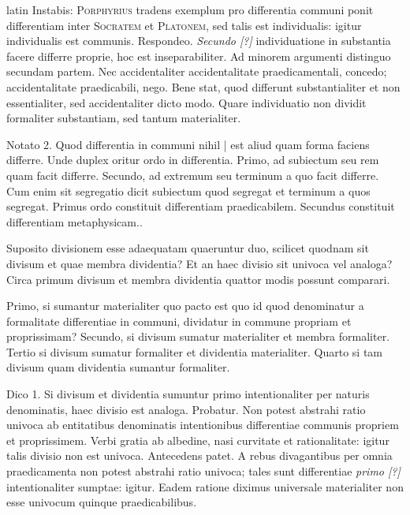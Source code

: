 \begin{otherlanguage*}{latin}
\pstart
 Instabis: \textsc{Porphyrius} tradens exemplum pro differentia communi ponit differentiam inter \textsc{Socratem} et \textsc{Platonem}, sed talis est individualis: igitur individualis est communis. Respondeo. \emph{Secundo [?]} individuatione in substantia facere differre proprie, hoc est inseparabiliter. Ad minorem argumenti distinguo secundam partem. Nec accidentaliter accidentalitate praedicamentali, concedo; accidentalitate praedicabili, nego. Bene stat, quod differunt substantialiter et non essentialiter, sed accidentaliter dicto modo. Quare individuatio non dividit formaliter substantiam, sed tantum materialiter. 
\pend

\pstart
 Notato 2. Quod differentia in communi nihil \textnormal{|} est aliud quam forma faciens differre. Unde duplex oritur ordo in differentia. Primo, ad subiectum seu rem quam facit differre. Secundo, ad extremum seu terminum a quo facit differre. Cum enim sit segregatio dicit subiectum quod segregat et terminum a quos segregat. Primus ordo constituit differentiam praedicabilem. Secundus constituit differentiam metaphysicam.. 
\pend

\pstart
 Suposito divisionem esse adaequatam quaeruntur duo, scilicet quodnam sit divisum et quae membra dividentia? Et an haec divisio sit univoca vel analoga? Circa primum divisum et membra dividentia quattor modis possunt comparari. 
\pend

\pstart
 Primo, si sumantur materialiter quo pacto est quo id quod denominatur a formalitate differentiae in communi, dividatur in commune propriam et proprissimam? Secundo, si divisum sumatur materialiter et membra formaliter. Tertio si divisum sumatur formaliter et dividentia materialiter. Quarto si tam divisum quam dividentia sumantur formaliter. 
\pend

\pstart
 Dico 1. Si divisum et dividentia sumuntur primo intentionaliter per naturis denominatis, haec divisio est analoga. Probatur. Non potest abstrahi ratio univoca ab entitatibus denominatis intentionibus differentiae communis propriem et proprissimem. Verbi gratia ab albedine, nasi curvitate et rationalitate: igitur talis divisio non est univoca. Antecedens patet. A rebus divagantibus per omnia praedicamenta non potest abstrahi ratio univoca; tales sunt differentiae \emph{primo [?]} intentionaliter sumptae: igitur. Eadem ratione diximus universale materialiter non esse univocum quinque praedicabilibus. 
\pend


\end{otherlanguage*}

